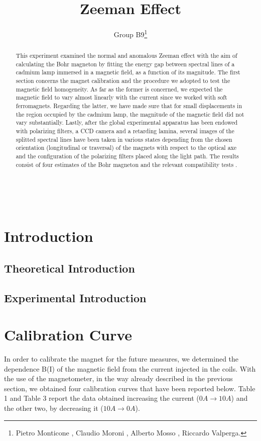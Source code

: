 \documentclass[a4paper,12pt,abstracton]{scrartcl}
\title{Zeeman Effect}
\author{Group B9\footnote{Pietro Monticone , Claudio Moroni , Alberto Mosso , Riccardo Valperga.}}
\begin{document}
\maketitle
\makenomenclature
\begin{abstract}
This experiment examined the normal and anomalous Zeeman effect with the aim of calculating the Bohr magneton by fitting the energy gap between spectral lines of a cadmium lamp immersed in a magnetic field, as a function of its magnitude. The first section concerns the magnet calibration and the procedure we adopted to test the magnetic field homogeneity. As far as the former is concerned, we expected the magnetic field to vary almost linearly with the current since we worked with soft ferromagnets. Regarding the latter, we have made sure that for small displacements in the region occupied by the cadmium lamp, the magnitude of the magnetic field did not vary substantially. Lastly, after the global experimental apparatus has been endowed with polarizing filters, a CCD camera and a retarding lamina, several images of the splitted spectral lines have been taken in various states depending from the chosen orientation (longitudinal or traversal) of the magnets with respect to the optical axe and the configuration of the polarizing filters placed along the light path. The results consist of four estimates of the Bohr magneton and the relevant compatibility tests .
\end{abstract}
\clearpage
\tableofcontents

\mbox{
}
\newpage
\setlength{\columnsep}{27pt} 
\begin{multicols}{2}
\printnomenclature
\end{multicols}
\newpage

\section{Introduction}
\subsection{Theoretical Introduction}
\subsection{Experimental Introduction}
\section{Calibration Curve}
In order to calibrate the magnet for the future measures, we determined the dependence B(I) of the magnetic field from the current injected in the coils. With the use of the magnetometer, in the way already described in the previous section, we obtained four calibration curves that have been reported below. Table 1 and Table 3 report the data obtained increasing the current ($0A \longrightarrow 10A$) and the other two, by decreasing it ($10A \longrightarrow 0A$). 
\end{document}
